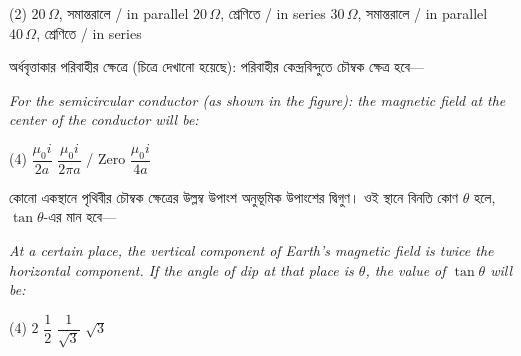 \documentclass[13pt,a4paper]{extarticle}
\newcommand{\questionheader}[1]{%
  \vspace{0.4cm}\noindent{\Large\textbf{#1}}\vspace{0.12cm}%
}
\begin{document}
\begin{tasks}(2)
  \task $20\,\Omega$, {\bengalifont সমান্তরালে} / in parallel
  \task $20\,\Omega$, {\bengalifont শ্রেণিতে} / in series
  \task $30\,\Omega$, {\bengalifont সমান্তরালে} / in parallel
  \task $40\,\Omega$, {\bengalifont শ্রেণিতে} / in series
\end{tasks}

\questionheader{Question 8}

{\bengalifont অর্ধবৃত্তাকার পরিবাহীর ক্ষেত্রে (চিত্রে দেখানো হয়েছে): পরিবাহীর কেন্দ্রবিন্দুতে চৌম্বক ক্ষেত্র হবে—}

\vspace{0.08cm}
\textit{For the semicircular conductor (as shown in the figure): the magnetic field at the center of the conductor will be:}

\begin{center}
\end{center}

\begin{tasks}(4)
  \task $\dfrac{\mu_0 i}{2a}$
  \task $\dfrac{\mu_0 i}{2\pi a}$
   / Zero
  \task $\dfrac{\mu_0 i}{4a}$
\end{tasks}

\questionheader{Question 9}

{\bengalifont কোনো একস্থানে পৃথিবীর চৌম্বক ক্ষেত্রের উল্লম্ব উপাংশ অনুভূমিক উপাংশের দ্বিগুণ। ওই স্থানে বিনতি কোণ $\theta$ হলে, $\tan\theta$-এর মান হবে—}

\vspace{0.08cm}
\textit{At a certain place, the vertical component of Earth's magnetic field is twice the horizontal component. If the angle of dip at that place is $\theta$, the value of $\tan\theta$ will be:}

\begin{tasks}(4)
  \task $2$
  \task $\dfrac{1}{2}$
  \task $\dfrac{1}{\sqrt{3}}$
  \task $\sqrt{3}$
\end{tasks}
\end{document}
